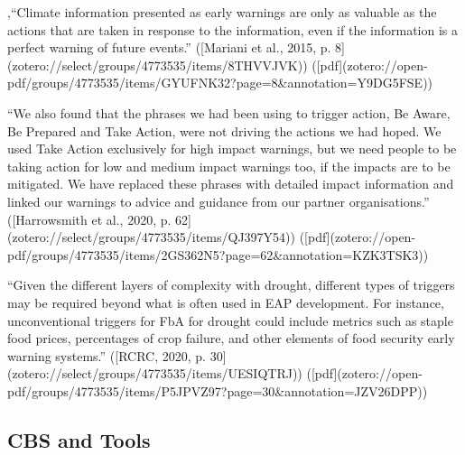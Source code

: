 ,“Climate information presented as early warnings are only as valuable as the actions that are taken in response to the information, even if the information is a perfect warning of future events.” ([Mariani et al., 2015, p. 8](zotero://select/groups/4773535/items/8THVVJVK)) ([pdf](zotero://open-pdf/groups/4773535/items/GYUFNK32?page=8&annotation=Y9DG5FSE))




“We also found that the phrases we had been using to trigger action, Be Aware, Be Prepared and Take Action, were not driving the actions we had hoped. We used Take Action exclusively for high impact warnings, but we need people to be taking action for low and medium impact warnings too, if the impacts are to be mitigated. We have replaced these phrases with detailed impact information and linked our warnings to advice and guidance from our partner organisations.” ([Harrowsmith et al., 2020, p. 62](zotero://select/groups/4773535/items/QJ397Y54)) ([pdf](zotero://open-pdf/groups/4773535/items/2GS362N5?page=62&annotation=KZK3TSK3))


“Given the different layers of complexity with drought, different types of triggers may be required beyond what is often used in EAP development. For instance, unconventional triggers for FbA for drought could include metrics such as staple food prices, percentages of crop failure, and other elements of food security early warning systems.” ([RCRC, 2020, p. 30](zotero://select/groups/4773535/items/UESIQTRJ)) ([pdf](zotero://open-pdf/groups/4773535/items/P5JPVZ97?page=30&annotation=JZV26DPP))



\subsection{CBS and Tools}




